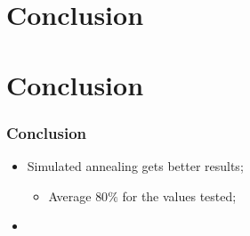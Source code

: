 \section{Conclusion}
\label{sec:conclusion}

\section{Conclusion}
\begin{frame}
	\frametitle{Conclusion}
	\begin{itemize}
		\item{Simulated annealing gets better results;
		\begin{itemize}
			\item{Average $80\%$ for the values tested;}
		\end{itemize}
		}
		\item{}
	\end{itemize}
\end{frame}